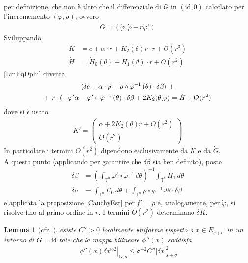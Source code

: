 \documentclass[twoside, 11pt]{amsbook}
\makeatletter
\newcommand{\0}{{(0)}}
\newcommand{\3}{{(3)}}
\theoremstyle{colonplain}
\newtheorem{lemma}[thm]{Lemma}
\theoremstyle{colondefinition}
\theoremstyle{colonremark}
\numberwithin{equation}{chapter}
\renewcommand{\proofname}{Dimostrazione}
\renewenvironment{proof}[1][\proofname]{\par
  \pushQED{\qed}%
  \normalfont \topsep6\p@\@plus6\p@\relax
  \trivlist
  \item[\hskip\labelsep\bfseries #1:]\ignorespaces
}{%
  \popQED\endtrivlist\@endpefalse
}
\makeatother
\begin{document}
\begin{proof}
\begin{align}
\end{align} 
per definizione, che non è altro che il differenziale di $G$ in $(\mathrm{id}, 0)$ calcolato per l'incrememento $(\dot{\varphi}, \dot{\rho})$, ovvero
\begin{align}
    \dot{G} = (\dot{\varphi}, \dot{\rho} - r\dot{\varphi}')
\end{align}
Sviluppando
\begin{align}
    K &= c + \alpha \cdot r + K_2(\theta)r \cdot r + O(r^3) \\
    \dot{H} &= \dot{H}_0(\theta) + \dot{H}_1(\theta) \cdot r + O(r^2)
\end{align}
\eqref{LinEqDphi} diventa
\begin{gather}
    (\delta c + \alpha \cdot \dot{\rho} - \rho \circ \varphi^{-1} \, (\theta) \cdot \delta\beta) \ + \notag \\
    + \ r \cdot (-\dot{\varphi}'\alpha + \varphi' \circ \varphi^{-1} \, (\theta) \cdot \delta\beta + 2K_2(\theta)\dot{\rho}) = \dot{H} + O(r^2)
\end{gather}
dove si è usato
\begin{align}
    K' = \begin{pmatrix}
        \alpha + 2K_2(\theta)r + O(r^2) \\
        O(r^2)
    \end{pmatrix}
\end{align}
In particolare i termini $O(r^2)$ dipendono esclusivamente da $K$ e da $\dot{G}$. \\ 
A questo punto (applicando \cite[Proposizione~24]{Fejoz02} per garantire che $\delta\beta$ sia ben definito), posto
\begin{align}
    \delta\beta &= \left(\int_{\mathbb{T}^n} \varphi' \circ \varphi^{-1} \, d\theta\right)^{-1}\int_{\mathbb{T}^n} \dot{H}_1 \, d\theta \\
    \delta c &= \int_{\mathbb{T}^n} \dot{H}_0 \, d\theta + \int_{\mathbb{T}^n} \rho \circ \varphi^{-1} \, d\theta \cdot \delta\beta
\end{align}
e applicata la proposizione \ref{CauchyEst} per $f' = \dot{\rho}$ e, analogamente, per $\dot{\varphi}$, si risolve fino al primo ordine in $r$. I termini $O(r^2)$ determinano $\delta K$.
\end{proof}
\begin{lemma}[cfr. \cite{Fejoz02}] esiste $C'' > 0$ localmente uniforme rispetto a $x \in E_{s + \sigma}$ in un intorno di $G = \mathrm{id}$ tale che la mappa bilineare $\phi''(x)$ soddisfa
\begin{align}
    |\phi''(x)\delta x^{\otimes 2}|_{G, s} \leq \sigma^{-2}C''|\delta x|^2_{s + \sigma}
\end{align}
\end{lemma}
\end{document}
